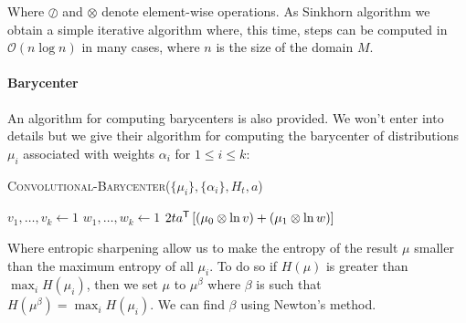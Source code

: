 Where $\oslash$ and $\otimes$ denote element-wise operations. As Sinkhorn algorithm we obtain a simple iterative algorithm where, this time, steps can be computed in $\mathcal{O}(n \log n)$ in many cases, where $n$ is the size of the domain $M$.

\paragraph{Barycenter}
An algorithm for computing barycenters is also provided. We won't enter into details but we give their algorithm for computing the barycenter of distributions $\mu_i$ associated with weights $\alpha_i$ for $1 \leqslant i \leqslant k$:

\vspace{3mm}
\begin{algorithm}[H]
	\caption{\textsc{Convolutional-Barycenter}($\{\mu_i\}, \{ \alpha_i \}, H_t, a$)}
	$v_1, \dots, v_k \gets 1$ \;
	$w_1, \dots, w_k \gets 1$ \;
	\Return $2t a^{\mathsf{T}} \left[ \left( \mu_0 \otimes \ln v \right) + \left( \mu_1 \otimes \ln w \right) \right]$
\end{algorithm}
\vspace{3mm}
Where entropic sharpening allow us to make the entropy of the result $\mu$ smaller than the maximum entropy of all $\mu_i$. To do so if $H(\mu)$ is greater than $\max_i H(\mu_i)$, then we set $\mu$ to $\mu^\beta$ where $\beta$ is such that $H(\mu^\beta) = \max_i H(\mu_i)$. We can find $\beta$ using Newton's method.

